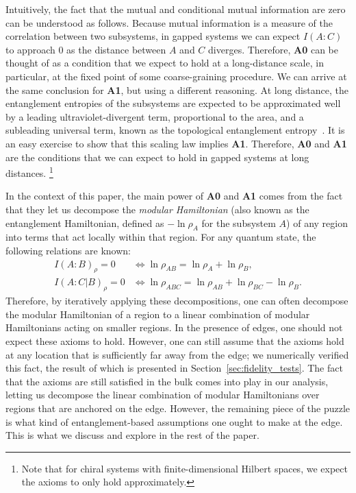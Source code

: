 \documentclass[12pt, nofootinbib]{article}
\theoremstyle{plain}
\theoremstyle{assumption}
\theoremstyle{definition}
\theoremstyle{plain}
\theoremstyle{plain}
\theoremstyle{plain}
\theoremstyle{plain}
\theoremstyle{plain}
\begin{document}
Intuitively, the fact that the mutual and conditional mutual information are zero can be understood as follows. Because mutual information is a measure of the correlation between two subsystems, in gapped systems we can expect $I(A:C)$ to approach $0$ as the distance between $A$ and $C$ diverges. Therefore, \textbf{A0} can be thought of as a condition that we expect to hold at a long-distance scale, in particular, at the fixed point of some coarse-graining procedure. We can arrive at the same conclusion for \textbf{A1}, but using a different reasoning. At long distance, the entanglement entropies of the subsystems are expected to be approximated well by a leading ultraviolet-divergent term, proportional to the area, and a subleading universal term, known as the topological entanglement entropy~\cite{Kitaev2006,Levin2006}. It is an easy exercise to show that this scaling law implies \textbf{A1}. Therefore, \textbf{A0} and \textbf{A1} are the conditions that we can expect to hold in gapped systems at long distances.
\footnote{Note that for chiral systems with finite-dimensional Hilbert spaces, we expect the axioms to only hold approximately.}

In the context of this paper, the main power of \textbf{A0} and \textbf{A1} comes from the fact that they let us decompose the \emph{modular Hamiltonian} \cite{Casini2008,Li2008} (also known as the entanglement Hamiltonian, defined as $-\ln \rho_A$ for the subsystem $A$) of any region into terms that act locally within that region. For any quantum state, the following relations are known:
\begin{equation}
    \begin{aligned}
        I(A:B)_{\rho}=0 &\iff  \ln  \rho_{AB} = \ln  \rho_A + \ln  \rho_B, \\
        I(A:C|B)_{\rho}=0 &\iff \ln \rho_{ABC} = \ln \rho_{AB} + \ln \rho_{BC} - \ln  \rho_B.
    \end{aligned}
    \label{eq:logrdm_decomposition}
\end{equation}
Therefore, by iteratively applying these decompositions, one can often decompose the modular Hamiltonian of a region to a linear combination of modular Hamiltonians acting on smaller regions. 
In the presence of edges, one should not expect these axioms to hold. However, one can still assume that the axioms hold at any location that is sufficiently far away from the edge; we numerically verified this fact, the result of which is presented in Section~\ref{sec:fidelity_tests}. The fact that the axioms are still satisfied in the bulk comes into play in our analysis, letting us decompose the linear combination of modular Hamiltonians over regions that are anchored on the edge. However, the remaining piece of the puzzle is what kind of entanglement-based assumptions one ought to make at the edge. This is what we discuss and explore in the rest of the paper. 
\end{document}
